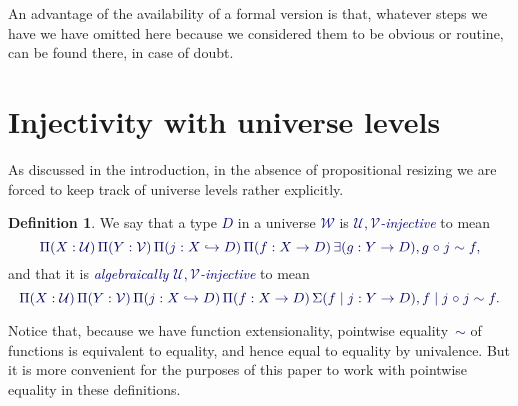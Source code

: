 \documentclass[10pt]{article}
\newcommand{\db}{\textcolor{darkblue}}
\newcommand{\emb}{\hookrightarrow}
\newcommand{\df}[1]{\emph{\db{#1}}}
\newcommand{\m}[1]{\db{$#1$}}
\newcommand{\M}[1]{\[\db{#1}\]}
\newcommand{\comp}{\mathrel{\circ}}
\newcommand{\U}{\mathcal{U}}
\newcommand{\V}{\mathcal{V}}
\newcommand{\W}{\mathcal{W}}
\theoremstyle{definition}
\newtheorem{definition}[numbered]{Definition}
\begin{document}
An advantage of the availability of a formal version is that, whatever
steps we have we have omitted here because we considered them to be
obvious or routine, can be found there, in case of doubt.


\section{Injectivity with universe levels}

As discussed in the introduction, in the absence of propositional
resizing we are forced to keep track of universe levels rather
explicitly.
\begin{definition}
We say that a type \m{D} in a universe \m{\W} is \df{\m{\U,\V}-injective}
to mean
%
\M{ \Pi(X : \U)\, \Pi(Y : \V)\, \Pi (j : X \emb D)\, \Pi(f : X \to D)\, \exists (g :
  Y \to D), g \comp j \sim f,
}
%
and that it is \df{algebraically \m{\U,\V}-injective} to mean
%
\M{
  \Pi(X : \U) \,\Pi(Y : \V)\,
  \Pi (j : X \emb D) \, \Pi(f : X \to D) \, \Sigma (f \mid j : Y \to D),
  f \mid j \comp j \sim f.
}
%
\end{definition}
\noindent Notice that, because we have function extensionality, pointwise
equality~\m{\sim} of functions is equivalent to equality, and
hence equal to equality by univalence. But it is more convenient for
the purposes of this paper to work with pointwise equality in these
definitions.
\end{document}
